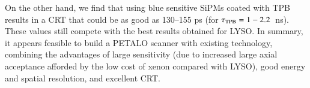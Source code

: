 \documentclass[review]{elsarticle}
\begin{document}
On the other hand, we find that using blue sensitive SiPMs coated with TPB results in a CRT that could be as good as
130--155 ps (for $\tau_{\rm{TPB}} = 1-2.2$~ns). These values still compete with the best results obtained for LYSO.  In summary, it appears feasible to build a PETALO scanner with existing technology, combining the advantages of large sensitivity (due to increased large axial acceptance afforded by the low cost of xenon compared with LYSO), good energy and spatial resolution, and excellent CRT.     

\section*{}


\end{document}
